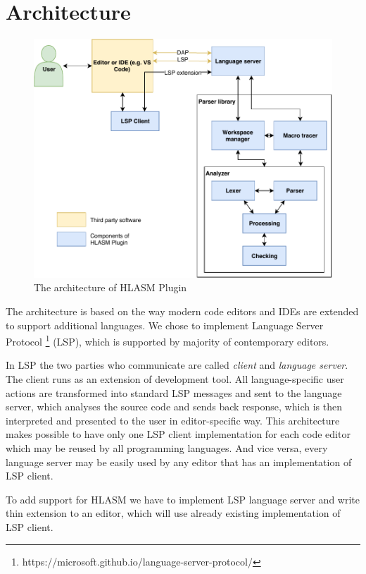 \chapter{Architecture}

\begin{figure}
	\centering
	\includegraphics[width=\textwidth]{img/hlasm_architecture}
	\caption{The architecture of HLASM Plugin}
	\label{fig03:arch}
\end{figure}

 The architecture is based on the way modern code editors and IDEs are extended to support additional languages. We chose to implement Language Server Protocol \footnote{https://microsoft.github.io/language-server-protocol/} (LSP), which is supported by majority of contemporary editors.

In LSP the two parties who communicate are called \emph{client}  and \emph{language server}. The client runs as an extension of development tool. All language-specific user actions are transformed into standard LSP messages and sent to the language server, which analyses the source code and sends back response, which is then interpreted and presented to the user in editor-specific way. This architecture makes possible to have only one LSP client implementation for each code editor which may be reused by all programming languages. And vice versa, every language server may be easily used by any editor that has an implementation of LSP client.

To add support for HLASM we have to implement LSP language server and write thin extension to an editor, which will use already existing implementation of LSP client. 

